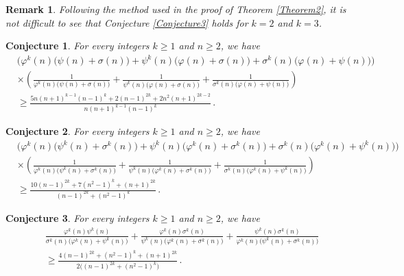 \documentclass[12pt]{article}
\newtheorem{remark}{Remark}
\newtheorem{conjecture}{Conjecture}
\begin{document}
\begin{remark} 
Following the method used in the proof of Theorem \ref{Theorem2}, it is not difficult to see that Conjecture \ref{Conjecture3} holds for $k=2$ and $k=3$.
\end{remark}


\begin{conjecture}\label{Conjecture4}
For every integers $k\geq1$ and $n\geq2$, we have
\begin{align*}
&\Big(\varphi^k(n)\big(\psi(n)+\sigma(n)\big)+\psi^k(n)\big(\varphi(n)+\sigma(n)\big)+\sigma^k(n)\big(\varphi(n)+\psi(n)\big)\Big)\\
&\times\left(\frac{1}{\varphi^k(n)\big(\psi(n)+\sigma(n)\big)}+\frac{1}{\psi^k(n)\big(\varphi(n)+\sigma(n)\big)}+\frac{1}{\sigma^k(n)\big(\varphi(n)+\psi(n)\big)}\right)\\
&\geq\frac{5n(n+1)^{k-1}(n-1)^k+2(n-1)^{2k}+2n^2(n+1)^{2k-2}}{n(n+1)^{k-1}(n-1)^k}\,. 
\end{align*}
\end{conjecture}


\begin{conjecture}\label{Conjecture5}
For every integers $k\geq1$ and $n\geq2$, we have
\begin{align*}
&\Big(\varphi^k(n)\big(\psi^k(n)+\sigma^k(n)\big)+\psi^k(n)\big(\varphi^k(n)+\sigma^k(n)\big)+\sigma^k(n)\big(\varphi^k(n)+\psi^k(n)\big)\Big)\\
&\times\left(\frac{1}{\varphi^k(n)\big(\psi^k(n)+\sigma^k(n)\big)}+\frac{1}{\psi^k(n)\big(\varphi^k(n)+\sigma^k(n)\big)}+\frac{1}{\sigma^k(n)\big(\varphi^k(n)+\psi^k(n)\big)}\right)\\
&\geq\frac{10(n-1)^{2k}+7(n^2-1)^k+(n+1)^{2k}}{(n-1)^{2k}+(n^2-1)^k}\,. 
\end{align*}
\end{conjecture}


\begin{conjecture}\label{Conjecture6}
For every integers $k\geq1$ and $n\geq2$, we have
\begin{align*}
&\frac{\varphi^k(n)\psi^k(n)}{\sigma^k(n)\big(\varphi^k(n)+\psi^k(n)\big)}+\frac{\varphi^k(n)\sigma^k(n)}{\psi^k(n)\big(\varphi^k(n)+\sigma^k(n)\big)}+\frac{\psi^k(n)\sigma^k(n)}{\varphi^k(n)\big(\psi^k(n)+\sigma^k(n)\big)}\\
&\geq\frac{4(n-1)^{2k}+(n^2-1)^k+(n+1)^{2k}}{2\big((n-1)^{2k}+(n^2-1)^k\big)}\,. 
\end{align*}
\end{conjecture}
\end{document}
